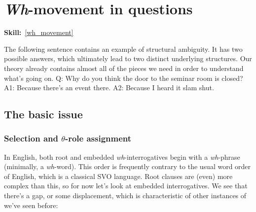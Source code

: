 \documentclass{article}
\begin{document}
\section{\emph{Wh}-movement in questions}
\hfill{}\textbf{Skill:}~\ref{wh_movement}

The following sentence contains an example of structural ambiguity. It has two possible answers, which ultimately lead to two distinct underlying structures. Our theory already contains almost all of the pieces we need in order to understand what's going on.
\ea Q: Why do you think the door to the seminar room is closed? \label{ex:wh-ambig}
    \ea A1: Because there's an event there.
    \ex A2: Because I heard it slam shut.
    \z
\z

\subsection{The basic issue}

\subsubsection[Selection and Theta-role assignment]{Selection and $\theta{}$-role assignment}

In English, both root and embedded \emph{wh}-interrogatives begin with a \emph{wh}-phrase (minimally, a \emph{wh}-word).
This order is frequently  contrary to the usual word order of English, which is a classical SVO language.
Root clauses are (even) more complex than this, so for now let's look at embedded interrogatives. We see that there's a gap, or some displacement, which is characteristic of other instances of  we've seen before:
\begin{exe}
    \label{ex.iwonder}
\end{exe}
\end{document}
